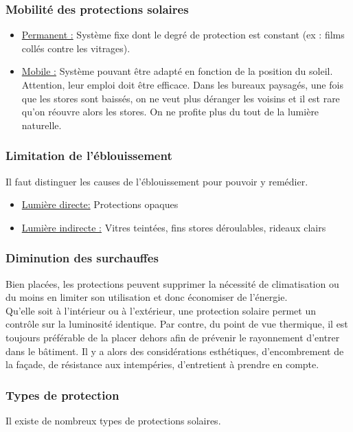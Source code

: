 \documentclass[11pt]{report}
\begin{document}
\subsubsection{Mobilité des protections solaires}
\begin{itemize}
\item \underline{Permanent :} Système fixe dont le degré de protection est constant (ex : films collés contre les vitrages).
\item \underline{Mobile :} Système pouvant être adapté en fonction de la position du soleil. Attention, leur emploi doit être efficace. Dans les bureaux paysagés, une fois que les stores sont baissés, on ne veut plus déranger les voisins et il est rare qu'on réouvre alors les stores. On ne profite plus du tout de la lumière naturelle.
\end{itemize}

\subsubsection{Limitation de l'éblouissement}
Il faut distinguer les causes de l'éblouissement pour pouvoir y remédier.
\begin{itemize}
\item \underline{Lumière directe:} Protections opaques
\item\underline{Lumière indirecte :} Vitres teintées, fins stores déroulables, rideaux clairs
\end{itemize}

\subsubsection{Diminution des surchauffes}
Bien placées, les protections peuvent supprimer la nécessité de climatisation ou du moins en limiter son utilisation et donc économiser de l'énergie. \\

Qu'elle soit à l'intérieur ou à l'extérieur, une protection solaire permet un contrôle sur la luminosité identique. Par contre, du point de vue thermique, il est toujours préférable de la placer dehors afin de prévenir le rayonnement d'entrer dans le bâtiment. Il y a alors des considérations esthétiques, d'encombrement de la façade, de résistance aux intempéries, d'entretient à prendre en compte.


\newpage
\subsubsection{Types de protection}
Il existe de nombreux types de protections solaires. \\
\end{document}

